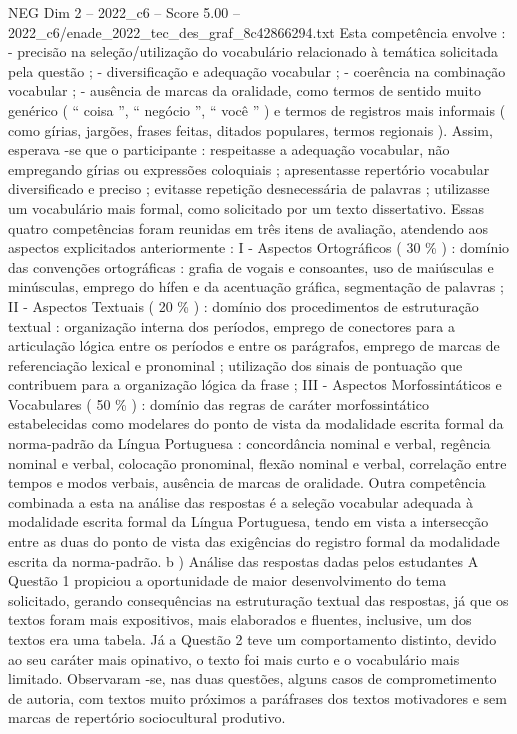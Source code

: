 \begin{textsample}{NEG Dim 2 – 2022\_c6 – Score 5.00 – 2022\_c6/enade\_2022\_tec\_des\_graf\_8c42866294.txt}
Esta competência envolve : - precisão na seleção/utilização do vocabulário relacionado à temática solicitada pela questão ; - diversificação e adequação vocabular ; - coerência na combinação vocabular ; - ausência de marcas da oralidade, como termos de sentido muito genérico ( “ coisa ”, “ negócio ”, “ você ” ) e termos de registros mais informais ( como gírias, jargões, frases feitas, ditados populares, termos regionais ).
Assim, esperava -se que o participante : respeitasse a adequação vocabular, não empregando gírias ou expressões coloquiais ; apresentasse repertório vocabular diversificado e preciso ; evitasse repetição desnecessária de palavras ; utilizasse um vocabulário mais formal, como solicitado por um texto dissertativo.
Essas quatro competências foram reunidas em três itens de avaliação, atendendo aos aspectos explicitados anteriormente : I - Aspectos Ortográficos ( 30 \% ) : domínio das convenções ortográficas : grafia de vogais e consoantes, uso de maiúsculas e minúsculas, emprego do hífen e da acentuação gráfica, segmentação de palavras ; II - Aspectos Textuais ( 20 \% ) : domínio dos procedimentos de estruturação textual : organização interna dos períodos, emprego de conectores para a articulação lógica entre os períodos e entre os parágrafos, emprego de marcas de referenciação lexical e pronominal ; utilização dos sinais de pontuação que contribuem para a organização lógica da frase ; III - Aspectos Morfossintáticos e Vocabulares ( 50 \% ) : domínio das regras de caráter morfossintático estabelecidas como modelares do ponto de vista da modalidade escrita formal da norma-padrão da Língua Portuguesa : concordância nominal e verbal, regência nominal e verbal, colocação pronominal, flexão nominal e verbal, correlação entre tempos e modos verbais, ausência de marcas de oralidade.
Outra competência combinada a esta na análise das respostas é a seleção vocabular adequada à modalidade escrita formal da Língua Portuguesa, tendo em vista a intersecção entre as duas do ponto de vista das exigências do registro formal da modalidade escrita da norma-padrão. b ) Análise das respostas dadas pelos estudantes A Questão 1 propiciou a oportunidade de maior desenvolvimento do tema solicitado, gerando consequências na estruturação textual das respostas, já que os textos foram mais expositivos, mais elaborados e fluentes, inclusive, um dos textos era uma tabela.
Já a Questão 2 teve um comportamento distinto, devido ao seu caráter mais opinativo, o texto foi mais curto e o vocabulário mais limitado.
Observaram -se, nas duas questões, alguns casos de comprometimento de autoria, com textos muito próximos a paráfrases dos textos motivadores e sem marcas de repertório sociocultural produtivo.

\end{textsample}
